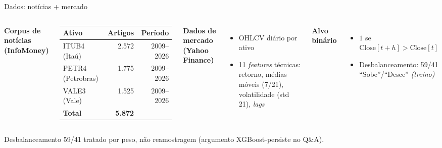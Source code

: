 \documentclass[10pt,aspectratio=169]{beamer}
\begin{document}
\begin{frame}{Dados: notícias + mercado}
  \begin{columns}[T]
    \textbf{Corpus de notícias (InfoMoney)}
    \begin{table}
      \footnotesize
      \begin{tabular}{lrr}
        \toprule
        \textbf{Ativo} & \textbf{Artigos} & \textbf{Período} \\
        \midrule
        ITUB4 (Itaú)      & 2.572 & 2009--2026 \\
        PETR4 (Petrobras) & 1.775 & 2009--2026 \\
        VALE3 (Vale)      & 1.525 & 2009--2026 \\
        \midrule
        \textbf{Total}    & \textbf{5.872} & \\
        \bottomrule
      \end{tabular}
    \end{table}
    \textbf{Dados de mercado (Yahoo Finance)}
    \begin{itemize}
      \item OHLCV diário por ativo
      \item 11 \textit{features} técnicas: retorno, médias móveis (7/21), volatilidade (std 21), \textit{lags}
    \end{itemize}
    \textbf{Alvo binário}
    \begin{itemize}
      \item $1$ se $\text{Close}[t+h] > \text{Close}[t]$
      \item Desbalanceamento: 59/41 ``Sobe''/``Desce'' \emph{(treino)}
    \end{itemize}
  \end{columns}
  \vspace{0.5ex}
  {\footnotesize Desbalanceamento 59/41 tratado por peso, não reamostragem (argumento XGBoost-persiste no Q\&A).}
\end{frame}
\end{document}
